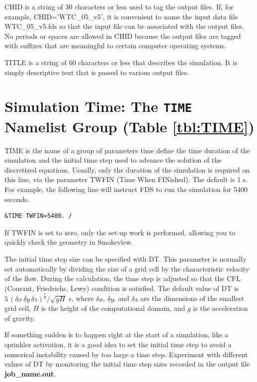\documentclass[11pt]{book}
\newcommand{\dx}{\delta x}
\newcommand{\dy}{\delta y}
\newcommand{\dz}{\delta z}
\newcommand{\ot}{\frac{1}{3}}
\begin{document}
\begin{description}
\item {\ct CHID} is a string
of 30 characters or less used to tag the output files. If, for example, {\ct CHID='WTC\_05\_v5'}, it is convenient to
name the input data file {\ct WTC\_05\_v5.fds} so that the input file
can be associated with the output files. No periods or spaces are allowed in
{\ct CHID} because the output files are tagged with suffixes that
are meaningful to certain computer operating systems.
\item {\ct TITLE} is a string of 60 characters or less that describes the
simulation. It is simply descriptive text that is passed to various output files.
\end{description}



\section{Simulation Time: The \texorpdfstring{{\tt TIME}}{TIME} Namelist Group (Table \ref{tbl:TIME})}%
\label{info:TIME}

{\ct TIME} is the name of a group of parameters time define the time
duration of the simulation and the initial time step used to advance
the solution of the discretized equations. Usually, only the
duration of the simulation is required on this line, via the
parameter {\ct TWFIN} (Time When FINished). The default is 1 s.
For example, the following line will instruct FDS to run the simulation for 5400 seconds.

\footnotesize
\begin{verbatim}
&TIME TWFIN=5400. /
\end{verbatim}
\normalsize
If {\ct TWFIN} is set to zero, only the set-up work is
performed, allowing you to quickly check the geometry in
Smokeview.

The initial time step size can be specified with
{\ct DT}. This parameter is normally set automatically by dividing the size of a grid cell by the
characteristic velocity of the flow.
During the calculation, the time step is adjusted so that the CFL (Courant, Friedrichs, Lewy) condition is
satisfied. The default value of {\ct DT} is $5 \, (\dx \, \dy \, \dz)^\ot/\sqrt{gH}$ s, where
$\dx$, $\dy$, and $\dz$ are the dimensions of the smallest grid
cell, $H$ is the height of the computational domain, and $g$ is the acceleration of gravity.

\begin{warning}
If something sudden is to
happen right at the start of a simulation, like a sprinkler activation, it is a good idea to set the initial time step
to avoid a numerical instability caused by too large a time step. Experiment with different values of {\ct DT}
by monitoring the initial time step sizes
recorded in the output file {\bf job\_name.out}.
\end{warning}
\end{document}
